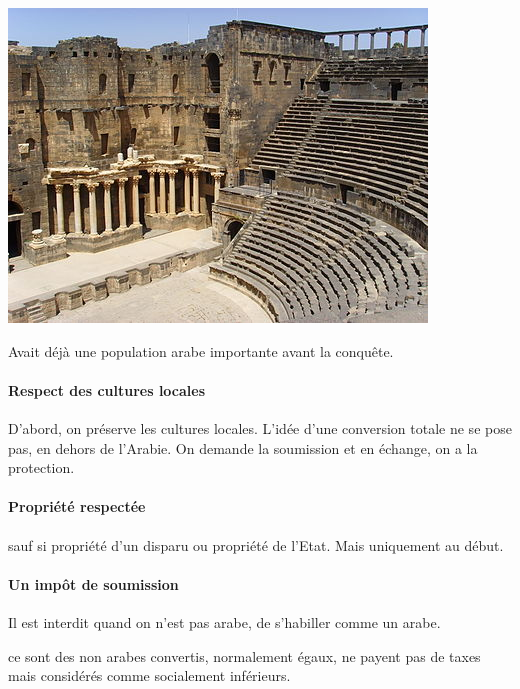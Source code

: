 \begin{Ex}
\begin{marginfigure}
\includegraphics[width=\textwidth]{HistoireIslamMediterranee/Images/TheaterBosra2.jpg}
\end{marginfigure}
    Avait déjà une population arabe importante avant la conquête. 
\end{Ex}

\paragraph{Respect des cultures locales} D'abord, on préserve les cultures locales. L'idée d'une conversion totale ne se pose pas, en dehors de l'Arabie. On demande la soumission et en échange, on a la protection. 

\paragraph{Propriété respectée} sauf si propriété d'un disparu ou propriété de l'Etat. Mais uniquement au début. 

\paragraph{Un impôt de soumission} Il est interdit quand on n'est pas arabe, de s'habiller comme un arabe. 
\begin{Def}[mawali]
    ce sont des non arabes convertis, normalement égaux, ne payent pas de taxes mais considérés comme socialement inférieurs.
\end{Def}


